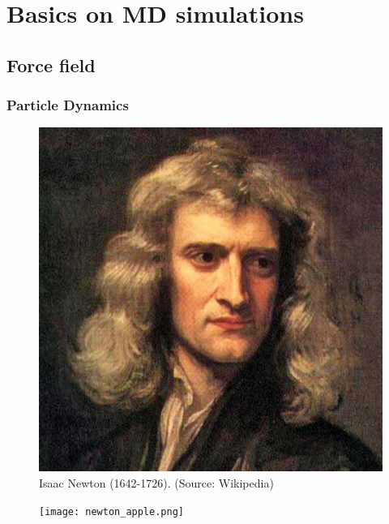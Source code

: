 \documentclass{beamer}
\begin{document}
\section{Basics on MD simulations }
\subsection{Force field} 

\begin{frame}\frametitle{Particle Dynamics}

\begin{minipage}[t]{0.4\linewidth}

\begin{figure}
\includegraphics[scale=0.16]{newton.jpg}
\caption{{\scriptsize  Isaac Newton (1642-1726). (Source: Wikipedia)}}
\end{figure}

\end{minipage}
\hfill%
\begin{minipage}[t]{0.58\linewidth}
\begin{figure}
\texttt{[image: newton\_apple.png]}
\end{figure}
\end{minipage}


\end{frame}
\end{document}
